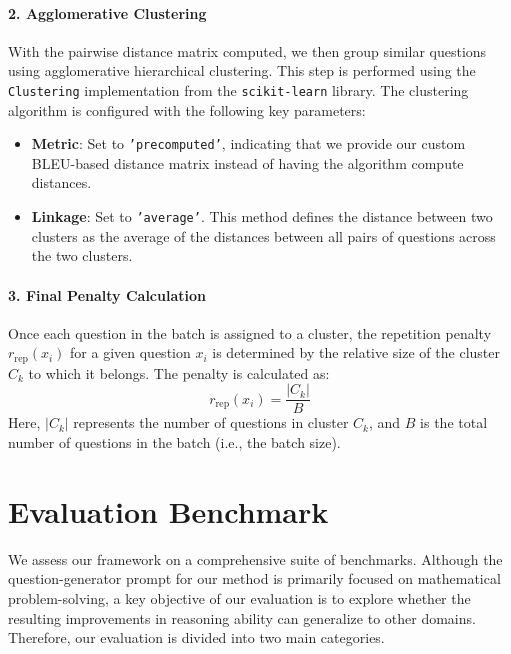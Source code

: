 \paragraph{2. Agglomerative Clustering}
With the pairwise distance matrix computed, we then group similar questions using agglomerative hierarchical clustering. This step is performed using the \texttt{Clustering} implementation from the \texttt{scikit-learn} library. The clustering algorithm is configured with the following key parameters:
\begin{itemize}
    \item \textbf{Metric}: Set to \texttt{'precomputed'}, indicating that we provide our custom BLEU-based distance matrix instead of having the algorithm compute distances.
    \item \textbf{Linkage}: Set to \texttt{'average'}. This method defines the distance between two clusters as the average of the distances between all pairs of questions across the two clusters.
\end{itemize}

\paragraph{3. Final Penalty Calculation}
Once each question in the batch is assigned to a cluster, the repetition penalty $r_{\text{rep}}(x_i)$ for a given question $x_i$ is determined by the relative size of the cluster $C_k$ to which it belongs. The penalty is calculated as:
\[
r_{\text{rep}}(x_i) = \frac{|C_k|}{B}
\]
Here, $|C_k|$ represents the number of questions in cluster $C_k$, and $B$ is the total number of questions in the batch (i.e., the batch size). 




\section{Evaluation Benchmark}
\label{sec:tasks_and_evaluation}
\label{app:tasks_and_evaluation}
We assess our framework on a comprehensive suite of benchmarks. Although the question-generator prompt for our method is primarily focused on mathematical problem-solving, a key objective of our evaluation is to explore whether the resulting improvements in reasoning ability can generalize to other domains. Therefore, our evaluation is divided into two main categories.


